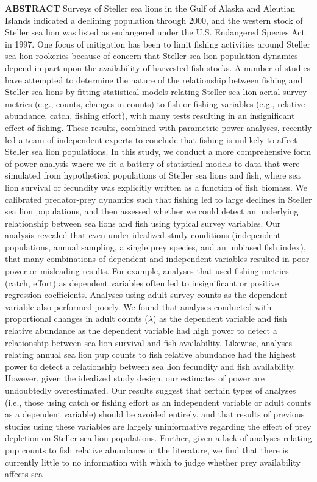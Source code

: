 \documentclass[11pt]{article}
\begin{document}
{\bf ABSTRACT} %
\large
Surveys of Steller sea lions in the Gulf of Alaska and Aleutian Islands indicated a declining population through 2000, and the western stock of Steller sea lion was listed as endangered under the U.S. Endangered Species Act in 1997.  One focus of mitigation has been to limit fishing activities around Steller sea lion rookeries because of concern that Steller sea lion population dynamics depend in part upon the availability of harvested fish stocks. A
number of studies have attempted to determine the nature of the relationship between fishing and Steller sea lions by fitting statistical models relating Steller sea lion aerial survey metrics (e.g., counts, changes in counts) to fish or fishing variables (e.g., relative abundance, catch, fishing effort), with many tests resulting in an insignificant effect of fishing.  These results, combined with parametric power analyses, recently led a team of independent experts \citep[e.g.,][]{Bernard:2011dq} to conclude that fishing is unlikely to affect Steller sea lion populations.  In this study, we conduct a more comprehensive form of power analysis where we fit a battery of statistical models to data that were simulated from hypothetical populations of Steller sea lions and fish, where sea lion survival or fecundity was explicitly written as a function of fish biomass.  We calibrated predator-prey dynamics such that fishing led to large declines in Steller sea lion populations, and then assessed whether we could detect an underlying relationship between sea lions and fish using typical survey variables.  Our analysis revealed that even under idealized study conditions (independent populations, annual sampling, a single prey species, and an unbiased fish index), that many combinations of dependent and independent variables resulted in poor power or misleading results.  For example, analyses that used fishing metrics (catch, effort) as dependent variables often led to insignificant or positive regression coefficients.  Analyses using adult survey counts as the dependent variable also performed poorly.  We found that analyses conducted with proportional changes in adult counts ($\lambda$) as the dependent variable and fish relative abundance as the dependent variable had high power to detect a relationship between sea lion survival and fish availability. Likewise, analyses relating annual sea lion pup counts to fish relative abundance had the highest power to detect a relationship between sea lion fecundity and fish availability. However, given the idealized study design, our estimates of power are undoubtedly overestimated.  Our results suggest that certain types of analyses (i.e., those using catch or fishing effort as an independent variable or adult counts as a dependent variable) should be avoided entirely, and that results of previous studies using these variables are largely uninformative regarding the effect of prey depletion on Steller sea lion populations.  Further, given a lack of analyses relating pup counts to fish relative abundance in the literature, we find that there is currently little to no information with which to judge whether prey availability affects sea 
\end{document}
